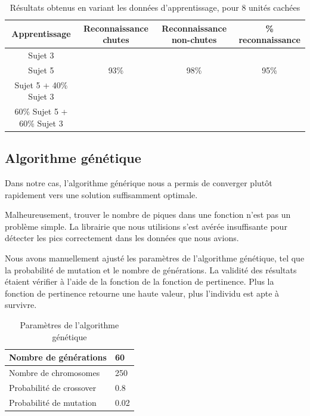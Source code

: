 \documentclass[12pt,letterpaper]{article}
\begin{document}
\begin{table}
\centering
\begin{tabular}{|c|c|c|c|}
    \hline
    Apprentissage & Reconnaissance chutes & Reconnaissance non-chutes & \% reconnaissance \\ \hline
    Sujet 3 &  &  &   \\ \hline
    Sujet 5 & 93\%  & 98\% & 95\% \\ \hline
    Sujet 5 + 40\% Sujet 3 &  &  &  \\ \hline
    60\% Sujet 5 + 60\% Sujet 3 & & & \\ \hline
\end{tabular}
\caption{Résultats obtenus en variant les données d'apprentissage, pour 8 unités cachées}
\label{tbl:neural_results_2}
\end{table}
\subsection{Algorithme génétique}

Dans notre cas, l'algorithme générique nous a permis de converger plutôt rapidement vers une solution suffisamment optimale.

Malheureusement, trouver le nombre de piques dans une fonction n'est pas un problème simple. La librairie que nous utilisions
s'est avérée insuffisante pour détecter les pics correctement dans les données que nous avions.

Nous avons manuellement ajusté les paramètres de l'algorithme génétique, tel que la probabilité de mutation et le nombre de générations.
La validité des résultats étaient vérifier à l'aide de la fonction de la fonction de pertinence. Plus la fonction de pertinence retourne
une haute valeur, plus l'individu est apte à survivre.

\begin{table}[h]
  \begin{center}
    \begin{tabular} {|l|l|}
        \hline
        Nombre de générations & 60 \\
        \hline
        Nombre de chromosomes & 250 \\
        \hline
        Probabilité de crossover & 0.8 \\
        \hline
        Probabilité de mutation & 0.02 \\
        \hline
    \end{tabular}
    \caption{Paramètres de l'algorithme génétique}
  \end{center}
\end{table}
\end{document}
